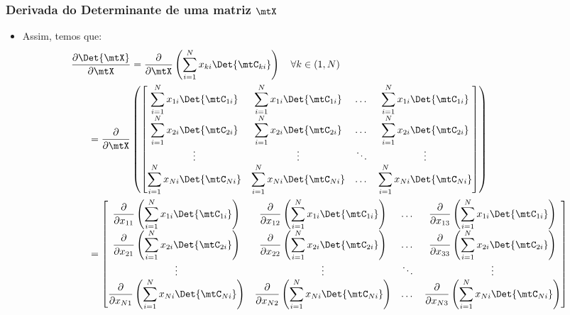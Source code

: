 \begin{frame}
	\frametitle{\normalsize Derivada do Determinante de uma matriz $\mtX$}
	\begin{itemize}
		\item Assim, temos que:
		{\tiny
		\begin{align*}
			\frac{\partial \Det{\mtX}}{\partial \mtX} &= \frac{\partial}{\partial \mtX} \left( \sum_{i = 1}^{N} x_{ki} \Det{\mtC_{ki}} \right) \,\,\,\,\,\, \forall k \in (1, N) \\
			&\hspace*{-10ex} = \frac{\partial}{\partial \mtX} \left( \begin{bmatrix}
				\displaystyle \sum_{i = 1}^{N} x_{1i} \Det{\mtC_{1i}} & 
				\displaystyle \sum_{i = 1}^{N} x_{1i} \Det{\mtC_{1i}} & 
				\dots & 
				\displaystyle \sum_{i = 1}^{N} x_{1i} \Det{\mtC_{1i}} \\
				\displaystyle \sum_{i = 1}^{N} x_{2i} \Det{\mtC_{2i}} & 
				\displaystyle \sum_{i = 1}^{N} x_{2i} \Det{\mtC_{2i}} & 
				\dots & 
				\displaystyle \sum_{i = 1}^{N} x_{2i} \Det{\mtC_{2i}} \\
				\vdots & \vdots & \ddots & \vdots \\
				\displaystyle \sum_{i = 1}^{N} x_{Ni} \Det{\mtC_{Ni}} & 
				\displaystyle \sum_{i = 1}^{N} x_{Ni} \Det{\mtC_{Ni}} & 
				\dots & 
				\displaystyle \sum_{i = 1}^{N} x_{Ni} \Det{\mtC_{Ni}}
			\end{bmatrix} \right) \\
			&\hspace*{-10ex} = \begin{bmatrix}
				\displaystyle \frac{\partial}{\partial x_{11}} \left( \sum_{i = 1}^{N} x_{1i} \Det{\mtC_{1i}} \right) & 
				\displaystyle \frac{\partial}{\partial x_{12}} \left( \sum_{i = 1}^{N} x_{1i} \Det{\mtC_{1i}} \right) & 
				\dots & 
				\displaystyle \frac{\partial}{\partial x_{13}} \left( \sum_{i = 1}^{N} x_{1i} \Det{\mtC_{1i}} \right) \\
				\displaystyle \frac{\partial}{\partial x_{21}} \left( \sum_{i = 1}^{N} x_{2i} \Det{\mtC_{2i}} \right) & 
				\displaystyle \frac{\partial}{\partial x_{22}} \left( \sum_{i = 1}^{N} x_{2i} \Det{\mtC_{2i}} \right) & 
				\dots & 
				\displaystyle \frac{\partial}{\partial x_{33}} \left( \sum_{i = 1}^{N} x_{2i} \Det{\mtC_{2i}} \right) \\
				\vdots & \vdots & \ddots & \vdots \\
				\displaystyle \frac{\partial}{\partial x_{N1}} \left( \sum_{i = 1}^{N} x_{Ni} \Det{\mtC_{Ni}} \right) & 
				\displaystyle \frac{\partial}{\partial x_{N2}} \left( \sum_{i = 1}^{N} x_{Ni} \Det{\mtC_{Ni}} \right) & 
				\dots & 
				\displaystyle \frac{\partial}{\partial x_{N3}} \left( \sum_{i = 1}^{N} x_{Ni} \Det{\mtC_{Ni}} \right) \\
			\end{bmatrix}
		\end{align*}}
	\end{itemize}
\end{frame}

